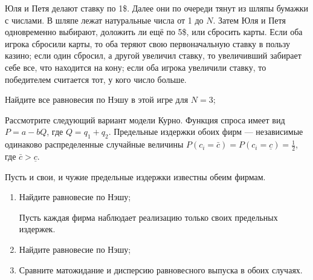 \begin{problem}
Юля и Петя делают ставку по 1\$. Далее они по очереди тянут из шляпы бумажки с числами. В шляпе лежат натуральные числа от 1 до  $N$. Затем Юля и Петя одновременно выбирают, доложить ли ещё по 5\$, или сбросить карты. Если оба игрока сбросили карты, то оба теряют свою первоначальную ставку в пользу казино; если один сбросил, а другой увеличил ставку, то увеличивший забирает себе все, что находится на кону; если оба игрока увеличили ставку, то победителем считается тот, у кого число больше.\par
Найдите все равновесия по Нэшу в этой игре для  $N=3$;\par



\begin{sol}

\end{sol}
\end{problem}



\begin{problem}
\begin{source}
\cite{colell:mt}
\end{source}
Рассмотрите следующий вариант модели Курно. Функция спроса имеет вид  $P=a-bQ$, где  $Q=q_{1} +q_{2} $. Предельные издержки обоих фирм --- независимые одинаково распределенные случайные величины  $P\left(c_{i} =\bar{c}\right)=P\left(c_{i} =\underline{c}\right)=\frac{1}{2} $, где  $\bar{c}>\underline{c}$.\par
Пусть и свои, и чужие предельные издержки известны обеим фирмам.\par
\begin{enumerate}
\item	Найдите равновесие по Нэшу;\par
Пусть каждая фирма наблюдает реализацию только своих предельных издержек.
\item 	Найдите равновесие по Нэшу;\par
\item 	Сравните матожидание и дисперсию равновесного выпуска в обоих случаях.\par
\end{enumerate}


\begin{sol}

\end{sol}
\end{problem}






